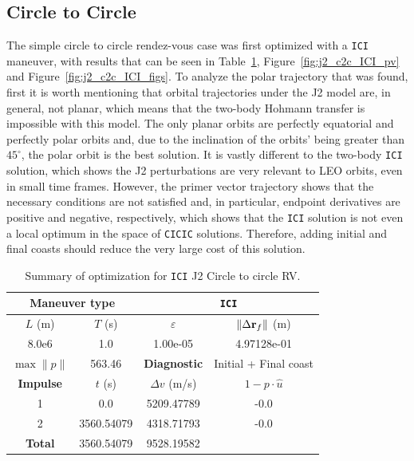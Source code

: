 \subsection{Circle to Circle}


The simple circle to circle rendez-vous case was first optimized with a \texttt{ICI} maneuver, with results that can be seen in Table~\ref{tab:J2_ctcr_ICI_tab}, Figure~\ref{fig:j2_c2c_ICI_pv} and Figure~\ref{fig:j2_c2c_ICI_figs}. To analyze the polar trajectory that was found, first it is worth mentioning that orbital trajectories under the J2 model are, in general, not planar, which means that the two-body Hohmann transfer is impossible with this model. The only planar orbits are perfectly equatorial and perfectly polar orbits and, due to the inclination of the orbits' being greater than \(45^\circ\), the polar orbit is the best solution. It is vastly different to the two-body \texttt{ICI} solution, which shows the J2 perturbations are very relevant to LEO orbits, even in small time frames. However, the primer vector trajectory shows that the necessary conditions are not satisfied and, in particular, endpoint derivatives are positive and negative, respectively, which shows that the \texttt{ICI} solution is not even a local optimum in the space of \texttt{CICIC} solutions. Therefore, adding initial and final coasts should reduce the very large cost of this solution.

\begin{table}[htpb]
    \centering
    \begin{tabular}{cccc} \toprule
    \multicolumn{2}{c}{\textbf{Maneuver type}} & \multicolumn{2}{c}{\texttt{ICI}} \\ \midrule
    \(L\) (m) & \(T\) (s) & \(\varepsilon\) & \(\lVert \Delta \mathbf{r}_{f} \rVert\) (m)    \\ \midrule
    8.0e6          & 1.0          & 1.00e-05                & 4.97128e-01                        \\ \midrule
    \(\max \lVert p \rVert\) & 563.46     & \textbf{Diagnostic}   & Initial + Final coast        \\ \midrule
    \textbf{Impulse} & \(t\) (s) & \(\Delta v\) (m/s) & \(1 - p \cdot \hat{u}\) \\ \midrule
    1                 & 0.0          & 5209.47789             & -0.0                    \\
    2                 & 3560.54079          & 4318.71793             & -0.0                    \\\midrule
    \textbf{Total}   & 3560.54079          & 9528.19582             &                     \\ \bottomrule   
    \end{tabular}
    \caption{Summary of optimization for \texttt{ICI} J2 Circle to circle RV.}
    \label{tab:J2_ctcr_ICI_tab}
\end{table}

